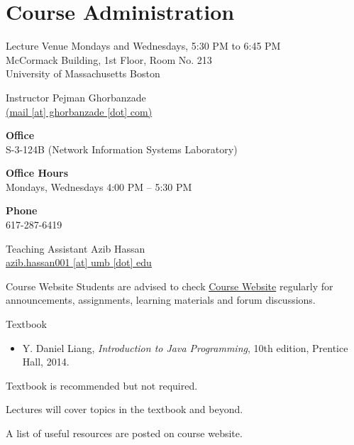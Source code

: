 \documentclass[10pt, compress]{beamer}
\begin{document}
\prepareCover

\section{Course Administration}

\begin{slide}
	\begin{block}{Lecture Venue}
		Mondays and Wednesdays, 5:30 PM to 6:45 PM\\
		McCormack Building, 1st Floor, Room No. 213\\
		University of Massachusetts Boston
	\end{block}
\end{slide}

\begin{slide}
	\begin{block}{Instructor}
		Pejman Ghorbanzade\\\href{mailto:mail@ghorbanzade.com}{(mail [at] ghorbanzade [dot] com)}

		\textbf{Office}\\S-3-124B (Network Information Systems Laboratory)

		\textbf{Office Hours}\\Mondays, Wednesdays 4:00 PM -- 5:30 PM

		\textbf{Phone}\\617-287-6419
	\end{block}
\end{slide}

\begin{slide}
	\begin{block}{Teaching Assistant}
		Azib Hassan\\\href{mailto:azib.hassan001@umb.edu}{azib.hassan001 [at] umb [dot] edu}
	\end{block}
\end{slide}

\begin{slide}
	\begin{block}{Course Website}
		Students are advised to check \href{http://www.ghorbanzade.com/teaching/UMB-CS114-2015F}{\alert{Course Website}} regularly for announcements, assignments, learning materials and forum discussions.
	\end{block}
\end{slide}

\begin{slide}
	\begin{block}{Textbook}
		\begin{itemize}
			\item[] Y. Daniel Liang, \emph{Introduction to Java Programming}, 10th edition, Prentice Hall, 2014.
		\end{itemize}
		Textbook is recommended but not required.

		Lectures will cover topics in the textbook and beyond.

		A list of useful resources are posted on course website.
	\end{block}
\end{slide}
\end{document}
